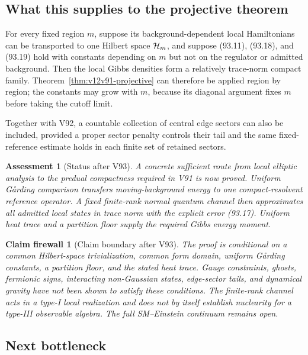 \documentclass[11pt]{article}
\newtheorem{firewall}[theorem]{Claim firewall}
\newtheorem{assessment}[theorem]{Assessment}
\theoremstyle{remark}
\begin{document}
\subsection{What this supplies to the projective theorem}

For every fixed region \(m\), suppose its background-dependent local
Hamiltonians can be transported to one Hilbert space
\({\cal H}_m\), and suppose (93.11), (93.18), and (93.19) hold with
constants depending on \(m\) but not on the regulator or admitted
background.  Then the local Gibbs densities form a relatively
trace-norm compact family.  Theorem~\ref{thm:v12v91-projective} can
therefore be applied region by region; the constants may grow with
\(m\), because its diagonal argument fixes \(m\) before taking the
cutoff limit.

Together with V92, a countable collection of central edge sectors
can also be included, provided a proper sector penalty controls
their tail and the same fixed-reference estimate holds in each
finite set of retained sectors.

\begin{assessment}[Status after V93]
\label{ass:v12v93-status}
A concrete sufficient route from local elliptic analysis to the
predual compactness required in V91 is now proved.  Uniform
G{\aa}rding comparison transfers moving-background energy to one
compact-resolvent reference operator.  A fixed finite-rank normal
quantum channel then approximates all admitted local states in
trace norm with the explicit error (93.17).  Uniform heat trace and
a partition floor supply the required Gibbs energy moment.
\end{assessment}

\begin{firewall}[Claim boundary after V93]
\label{fire:v12v93-claim}
The proof is conditional on a common Hilbert-space trivialization,
common form domain, uniform G{\aa}rding constants, a partition
floor, and the stated heat trace.  Gauge constraints, ghosts,
fermionic signs, interacting non-Gaussian states, edge-sector tails,
and dynamical gravity have not been shown to satisfy these
conditions.  The finite-rank channel acts in a type-I local
realization and does not by itself establish nuclearity for a
type-III observable algebra.  The full SM--Einstein continuum
remains open.
\end{firewall}

\subsection{Next bottleneck}
\end{document}
